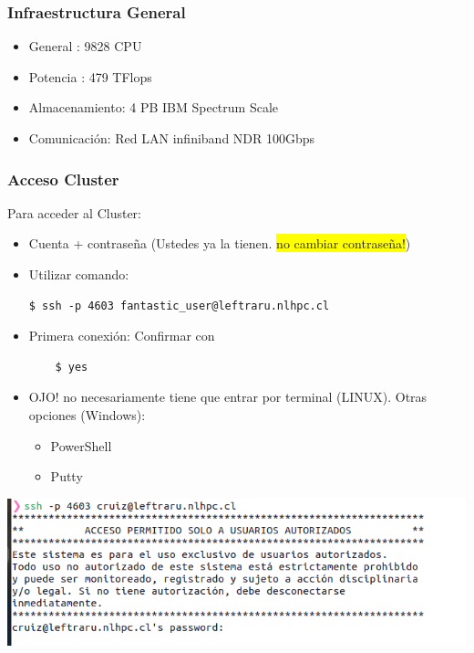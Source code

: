 \documentclass[aspectratio=169,professionalfonts]{beamer}
\newenvironment{minted}[2][]{\VerbatimEnvironment\begin{Verbatim}[#1]}{\end{Verbatim}}
\newcommand{\hl}[1]{\colorbox{yellow}{#1}}
\begin{document}
\begin{frame}[fragile]
\frametitle{\textbf{Infraestructura General}}
\begin{itemize}
    \item General : 9828 CPU
        \vspace{0.5em} %
    \item Potencia : 479 TFlops
        \vspace{0.5em} %
    \item Almacenamiento: 4 PB IBM Spectrum Scale
        \vspace{0.5em} 
    \item Comunicación: Red LAN infiniband NDR 100Gbps
\end{itemize}
    
\end{frame}




\begin{frame}[fragile]
\frametitle{\textbf{Acceso Cluster}}

Para acceder al Cluster: 
\begin{itemize}
    \item Cuenta + contraseña (Ustedes ya la tienen. \hl{no cambiar contraseña!})
    
    \item Utilizar comando: 
     \begin{verbatim}
$ ssh -p 4603 fantastic_user@leftraru.nlhpc.cl
  \end{verbatim}
    \item Primera conexión: Confirmar con 
    \begin{verbatim}
    $ yes 
    \end{verbatim} 
    \item  OJO! no necesariamente tiene que entrar por terminal (LINUX). Otras opciones (Windows): 
        \begin{itemize}
            \item PowerShell
            \item Putty
        \end{itemize}
    \end{itemize}
\begin{center}
\includegraphics[scale=0.3]{FIGURES/ssh_2.png}
\end{center}
     \vspace{0.5em}
\end{frame}
\end{document}
